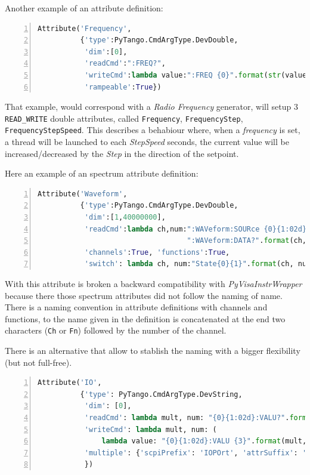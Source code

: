\documentclass[a4paper,10pt]{article}
\begin{document}
Another example of an attribute definition:

\begin{lstlisting}[language=python, basicstyle=\ttfamily\small\footnotesize, numbers=left]
Attribute('Frequency',
          {'type':PyTango.CmdArgType.DevDouble,
           'dim':[0],
           'readCmd':":FREQ?",
           'writeCmd':lambda value:":FREQ {0}".format(str(value)),
           'rampeable':True})
\end{lstlisting}

That example, would correspond with a \emph{Radio Frequency} generator, will setup 3 {\tt READ\_WRITE} double attributes, called {\tt Frequency}, {\tt FrequencyStep}, {\tt FrequencyStepSpeed}. This describes a behabiour where, when a \emph{frequency} is set, a thread will be launched to each \emph{StepSpeed} seconds, the current value will be increased/decreased by the \emph{Step} in the direction of the setpoint.

Here an example of an spectrum attribute definition:

\begin{lstlisting}[language=python, basicstyle=\ttfamily\small\footnotesize, numbers=left]
Attribute('Waveform',
          {'type':PyTango.CmdArgType.DevDouble,
           'dim':[1,40000000],
           'readCmd':lambda ch,num:":WAVeform:SOURce {0}{1:02d};"
                                   ":WAVeform:DATA?".format(ch,num),
           'channels':True, 'functions':True,
           'switch': lambda ch, num:"State{0}{1}".format(ch, num)})
\end{lstlisting}

With this attribute is broken a backward compatibility with \emph{PyVisaInstrWrapper} because there those spectrum attributes did not follow the naming of name. There is a naming convention in attribute definitions with channels and functions, to the name given in the definition is concatenated at the end two characters ({\tt Ch} or {\tt Fn}) followed by the number of the channel.

There is an alternative that allow to stablish the naming with a bigger flexibility (but not full-free). 

\begin{lstlisting}[language=python, basicstyle=\ttfamily\small\footnotesize, numbers=left]
Attribute('IO',
          {'type': PyTango.CmdArgType.DevString,
           'dim': [0],
           'readCmd': lambda mult, num: "{0}{1:02d}:VALU?".format(mult, num),
           'writeCmd': lambda mult, num: (
               lambda value: "{0}{1:02d}:VALU {3}".format(mult, num, value)),
           'multiple': {'scpiPrefix': 'IOPOrt', 'attrSuffix': 'Port'}
           })
\end{lstlisting}
\end{document}
